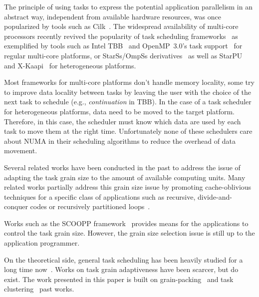 
The principle of using tasks to express the potential application
parallelism in an abstract way, independent from available hardware
resources, was once popularized by tools such as
Cilk~\cite{cilk}. The widespread availability of multi-core processors
recently revived the popularity of task scheduling frameworks~\cite{taskscomparison} as
exemplified by tools such as Intel TBB~\cite{Intel::TBB} and
OpenMP~3.0's task support~\cite{openmptasks} for regular multi-core platforms,
or StarSs/OmpSs derivatives~\cite{ompss} as well as StarPU~\cite{starpu} and
X-Kaapi~\cite{xkaapi} for heterogeneous platforms. 

Most frameworks for multi-core platforms don't handle memory locality, some
try to improve data locality between tasks by leaving the user with the choice of the next task
to schedule (e.g., {\em continuation} in TBB). In the case of a task scheduler for
heterogeneous platforms, data need to be moved to the target platform. Therefore, in this case, the
scheduler must know which data are used by each task to move them at the right
time. Unfortunately none of these schedulers care about NUMA in their scheduling algorithms to reduce the overhead 
of data movement.

Several related works have been conducted in the past to address the
issue of adapting the task grain size to the amount of available
computing units. Many related works partially address this
grain size issue by promoting cache-oblivious techniques for a specific class of
applications such as recursive, divide-and-conquer
codes or recursively partitioned loops~\cite{unifieddataflow,Intel::TBB,cilk,xkaapi,taskscomparison}.

Works such as the SCOOPP framework~\cite{scoopp} provides means for the applications to control
the task grain size. However, the grain size selection issue is still up to
the application programmer. 

On the theoretical side, general task scheduling has been heavily studied for
a long time now~\cite{Khan94acomparison,heft}. Works on task grain
adaptiveness have been scarcer, but do exist. The work presented in this
paper is built on grain-packing~\cite{GeY96} and task clustering~\cite{triplet}
past works.
